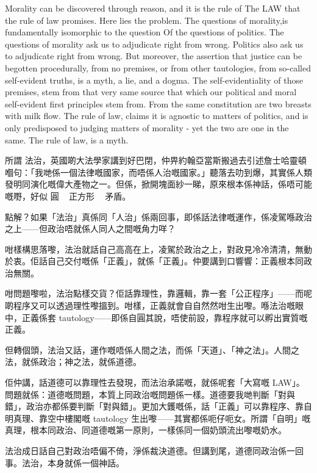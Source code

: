 Morality can be discovered through reason, and it is the rule of The LAW that the rule of law promises. Here lies the problem. The questions of morality,is fundamentally isomorphic to the question Of the questions of politics. The questions of morality ask us to adjudicate right from wrong. Politics also ask us to adjudicate right from wrong. But moreover, the assertion that justice can be begotten procedurally, from no premises, or from other tautologies, from so-called self-evident truths, is a myth, a lie, and a dogma. The self-evidentiality of those premises, stem from that very same source that which our political and moral self-evident first principles stem from. From the same constitution are two breasts with milk flow. The rule of law, claims it is agnostic to matters of politics, and is only predisposed to judging matters of morality - yet the two are one in the same. The rule of law, is a myth. 


所謂 法治，英國啲大法學家講到好巴閉，仲畀約翰亞當斯搬過去引述詹士哈靈頓嗰句：「我哋係一個法律嘅國家，而唔係人治嘅國家。」聽落去叻到爆，其實係人類發明同演化嘅偉大產物之一。但係，掀開塊面紗一睇，原來根本係神話，係唔可能嘅嘢，好似 圓󱝚 正方形 󱜩󱝚 矛盾。

點解？如果「法治」真係同「人治」係兩回事，即係話法律嘅運作，係凌駕喺政治之上——但政治唔就係人同人之間嘅角力咩？

咁樣構思落嚟，法治就話自己高高在上，凌駕於政治之上，對政見冷冷清清，無動於衷。佢話自己交付嘅係「正義」，就係「正義」。仲要講到口響響：正義根本同政治無關。

咁問題嚟啦，法治點樣交貨？佢話靠理性，靠邏輯，靠一套「公正程序」——而呢啲程序又可以透過理性嚟搵到。咁樣，正義就會自自然然咁生出嚟。喺法治嘅眼中，正義係套 tautology——即係自圓其說，唔使前設，靠程序就可以孵出實質嘅正義。

但轉個頭，法治又話，運作嘅唔係人間之法，而係「天道」、「神之法」。人間之法，就係政治；神之法，就係道德。

佢仲講，話道德可以靠理性去發現，而法治承諾嘅，就係呢套「大寫嘅 LAW」。問題就係：道德嘅問題，本質上同政治嘅問題係一樣。道德要我哋判斷「對與錯」，政治亦都係要判斷「對與錯」。更加大鑊嘅係，話「正義」可以靠程序、靠自明真理、靠空中樓閣嘅 tautology 生出嚟——其實都係呃仔呃女。所謂「自明」嘅真理，根本同政治、同道德嘅第一原則，一樣係同一個奶頭流出嚟嘅奶水。

法治成日話自己對政治唔偏不倚，淨係裁決道德。但講到尾，道德同政治係一回事。法治，本身就係一個神話。

\section{}


